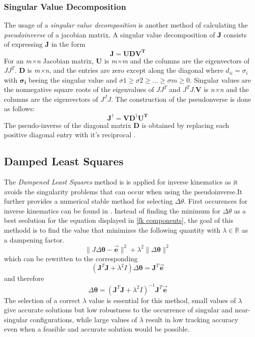 \subsubsection{Singular Value Decomposition}
The usage of a \textit{singular value decomposition} is another method of calculating the \textit{pseudoinverse} of a jacobian matrix. A singular value decomposition of \textbf{J} consists of expressing \textbf{J} in the form
\begin{equation}
\pmb{J} = \pmb{UDV^{T}}
\end{equation} 
For an \textit{m×n} Jacobian matrix, \textbf{U} is\textit{ m×m} and the columns are the eigenvectors of $JJ^{T}$. \textbf{D} is \textit{m×n}, and the entries are zero except along the diagonal where $d_{ii}=\sigma_{i}$ with $\pmb{\sigma_{i}}$ beeing the singular value and $\sigma 1\geq \sigma 2 \geq ...\geq \sigma m \geq 0$. Singular values are the nonnegative square roots of the eigenvalues of $JJ^{T}$ and $ J^{T}J$.\textbf{V} is \textit{n×n} and the columns are the eigenvectors of $J^{J}J$.
The construction of the pseudonverse is done as follows:
\begin{equation}
\pmb{J}^{\dagger} = \pmb{VD^{\dagger}U^{T}}
\end{equation} 
The pseudo-inverse of the diagonal matrix \textbf{D} is obtained by replacing each positive diagonal entry with it's reciprocal \cite{Golub.1965}.
\subsection{Damped Least Squares}
 The \textit{Dampened Least Squares} method is is applied for inverse kinematics as it avoids the singularity problems that can occur when using the pseudoinverse.It further provides a numerical stable method for selecting $\Delta\theta$. First occurences for inverse kinematics can be found in \cite{Wampler.1986,Nakamura.1986}.
Instead of finding the minimum for $\Delta\theta$ as a best seolution for the equation displayed in \ref{fk components}, the goal of this methodd is to find the value that minimizes the following quantity with $\lambda \in \mathbb{R} $ as a dampening factor.
\begin{equation}
\parallel J\Delta\pmb{\theta}-\vec{\pmb{e}}\parallel^{2}+\lambda^{2}\parallel\Delta\pmb{\theta}\parallel^{2}
\end{equation}
which can be rewritten to the corresponding 
\begin{equation}
(\pmb{J}^{T}\pmb{J}+\lambda^{2}I)\Delta\pmb{\theta}=\pmb{J}^{T}\vec{\pmb{e}}
\end{equation}
and therefore 
\begin{equation}
\Delta\pmb{\theta}=(\pmb{J}^{T}\pmb{J}+\lambda^{2}I)^{-1}\pmb{J}^{T}\vec{\pmb{e}}
\end{equation}
The selection of a correct $\lambda$ value is essential for this method, small values of $\lambda$ give accurate solutions but low robustness to the occurrence of singular and near-singular configurations, while large  values of $\lambda$ result in low tracking accuracy even when a feasible and accurate solution would be possible\cite{Chiaverini.1994,AndreasAristidouandJoanLasenby.2009}.

